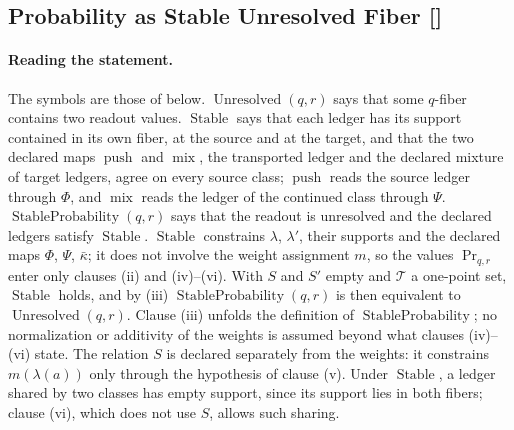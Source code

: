 \subsection{Probability as Stable Unresolved Fiber [\texorpdfstring{}{F23}]}\label{sec:status-records-coherence:probability}

\paragraph{Reading the statement.} The symbols are those of  below.
\(\operatorname{Unresolved}(q,r)\) says that some \(q\)-fiber contains
two readout values. \(\operatorname{Stable}\) says that each ledger has its
support contained in its own fiber, at the source and at the target, and that
the two declared maps \(\operatorname{push}\) and \(\operatorname{mix}\),
the transported ledger and the declared mixture of target ledgers, agree on
every source class; \(\operatorname{push}\) reads the source ledger through
\(\Phi\), and \(\operatorname{mix}\) reads the ledger of the continued class
through \(\Psi\).
\(\operatorname{StableProbability}(q,r)\) says that the readout is
unresolved and the declared ledgers satisfy \(\operatorname{Stable}\).
\(\operatorname{Stable}\) constrains \(\lambda\), \(\lambda'\), their supports and
the declared maps \(\Phi\), \(\Psi\), \(\bar\kappa\); it does not involve the
weight assignment \(m\), so the values \(\operatorname{Pr}_{q,r}\) enter only
clauses (ii) and (iv)--(vi). With \(S\) and \(S'\) empty and \(\mathcal T\) a
one-point set, \(\operatorname{Stable}\) holds, and by (iii)
\(\operatorname{StableProbability}(q,r)\) is then equivalent to
\(\operatorname{Unresolved}(q,r)\).  Clause (iii) unfolds the definition
of \(\operatorname{StableProbability}\); no normalization or additivity
of the weights is assumed beyond what clauses (iv)--(vi) state. The relation \(S\) is declared separately from the weights: it constrains \(m(\lambda(a))\) only through the hypothesis of clause (v). Under \(\operatorname{Stable}\), a ledger shared by two classes has empty support, since its support lies in both fibers; clause (vi), which does not use \(S\), allows such sharing.

